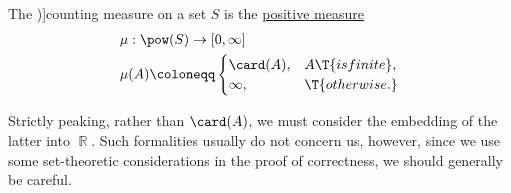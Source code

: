 \begin{definition}\label{def:counting_measure}
  The \term[ru=считающая мера (\cite[exerc. 4.7.78]{Богачёв2003ОсновыТеорииМерыТом1})]{counting measure} on a set \( S \) is the \hyperref[def:measure/positive]{positive measure}
  \begin{equation}\label{eq:def:counting_measure}
    \begin{aligned}
      &\mu: \pow(S) \to [0, \infty] \\
      &\mu(A) \coloneqq \begin{cases}
        \card(A), &A \T{is finite}, \\
        \infty,   &\T{otherwise.}
      \end{cases}
    \end{aligned}
  \end{equation}
\end{definition}
\begin{comments}
  \item Strictly peaking, rather than \( \card(A) \), we must consider the embedding of the latter into \( \BbbR \). Such formalities usually do not concern us, however, since we use some set-theoretic considerations in the proof of correctness, we should generally be careful.
\end{comments}

